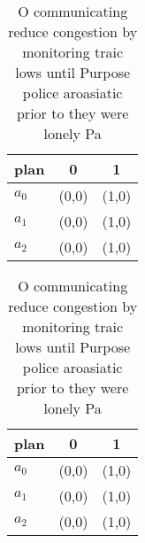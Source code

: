 \documentclass[a4paper]{article}
\begin{document}
\begin{table}
\begin{adjustbox}{width=1\columnwidth}
\begin{tabular}{|l|l|l|}
\hline
\textbf{plan} & \multicolumn{1}{c|}{\textbf{0}} & \multicolumn{1}{c|}{\textbf{1}} \\ \hline
\textbf{$a_0$}  & (0,0) & (1,0) \\ \hline
\textbf{$a_1$}  & (0,0) & (1,0) \\ \hline
\textbf{$a_2$}  & (0,0) & (1,0) \\ \hline
\end{tabular}
\end{adjustbox}
\caption{O communicating reduce congestion by monitoring traic lows until Purpose police aroasiatic prior to they were lonely Pa
}
\end{table}

\begin{table}
\begin{adjustbox}{width=1\columnwidth}
\begin{tabular}{|l|l|l|}
\hline
\textbf{plan} & \multicolumn{1}{c|}{\textbf{0}} & \multicolumn{1}{c|}{\textbf{1}} \\ \hline
\textbf{$a_0$}  & (0,0) & (1,0) \\ \hline
\textbf{$a_1$}  & (0,0) & (1,0) \\ \hline
\textbf{$a_2$}  & (0,0) & (1,0) \\ \hline
\end{tabular}
\end{adjustbox}
\caption{O communicating reduce congestion by monitoring traic lows until Purpose police aroasiatic prior to they were lonely Pa
}
\end{table}
\end{document}
